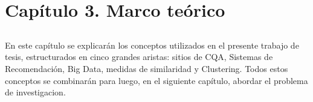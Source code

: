 \chapter*{Capítulo 3. \textbf{Marco teórico}}\label{ch:marcoteorico}

\section*{}
\addtocounter{section}{1}
\setcounter{subsection}{0}

En este capítulo se explicarán los conceptos utilizados en el presente trabajo de tesis, estructurados en cinco grandes aristas: sitios de CQA, Sistemas de Recomendación, Big Data, medidas de similaridad y Clustering. Todos estos conceptos se combinarán para luego, en el siguiente capítulo, abordar el problema de investigacion.








